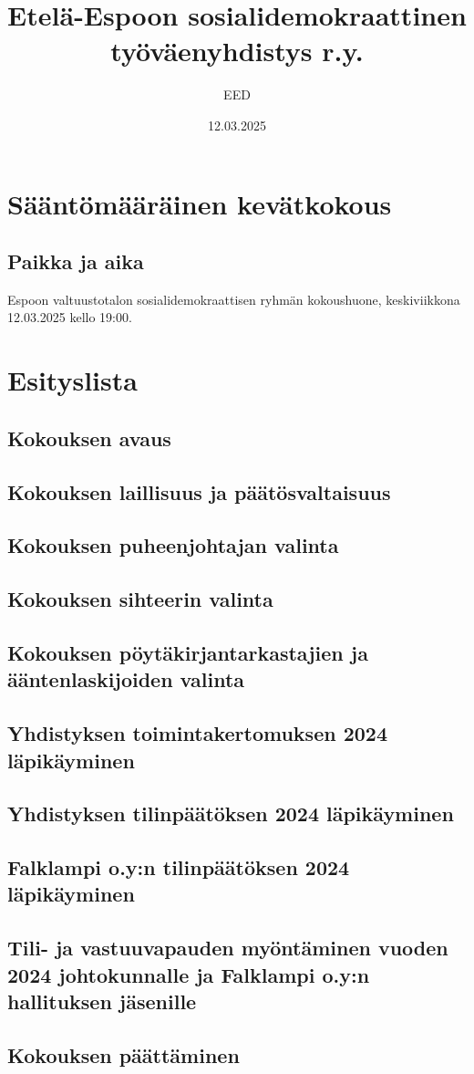 \documentclass[a4paper,12pt]{article}
\title{Etelä-Espoon sosialidemokraattinen työväenyhdistys r.y.}
\author{EED}
\date{12.03.2025}
\begin{document}
\maketitle
\tableofcontents
\section*{Sääntömääräinen kevätkokous}
\subsection*{Paikka ja aika}
Espoon valtuustotalon sosialidemokraattisen ryhmän kokoushuone, keskiviikkona 12.03.2025 kello 19:00.
\section*{Esityslista}
\subsection{Kokouksen avaus}
\subsection{Kokouksen laillisuus ja päätösvaltaisuus}
\subsection{Kokouksen puheenjohtajan valinta}
\subsection{Kokouksen sihteerin valinta}
\subsection{Kokouksen pöytäkirjantarkastajien ja ääntenlaskijoiden valinta}
\subsection{Yhdistyksen toimintakertomuksen 2024 läpikäyminen}
\subsection{Yhdistyksen tilinpäätöksen 2024 läpikäyminen}
\subsection{Falklampi o.y:n tilinpäätöksen 2024 läpikäyminen}
\subsection{Tili- ja vastuuvapauden myöntäminen vuoden 2024 johtokunnalle ja Falklampi o.y:n hallituksen jäsenille}
\subsection{Kokouksen päättäminen}
\end{document}
